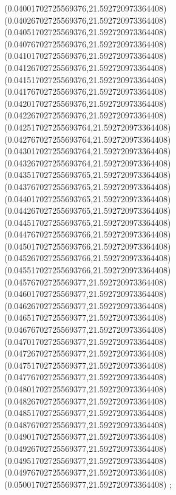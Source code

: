 {(0.04001702725569376,21.592720973364408)
(0.04026702725569376,21.592720973364408)
(0.04051702725569376,21.592720973364408)
(0.04076702725569376,21.592720973364408)
(0.04101702725569376,21.592720973364408)
(0.04126702725569376,21.592720973364408)
(0.04151702725569376,21.592720973364408)
(0.04176702725569376,21.592720973364408)
(0.04201702725569376,21.592720973364408)
(0.04226702725569376,21.592720973364408)
(0.042517027255693764,21.592720973364408)
(0.042767027255693764,21.592720973364408)
(0.043017027255693764,21.592720973364408)
(0.043267027255693764,21.592720973364408)
(0.043517027255693765,21.592720973364408)
(0.043767027255693765,21.592720973364408)
(0.044017027255693765,21.592720973364408)
(0.044267027255693765,21.592720973364408)
(0.044517027255693765,21.592720973364408)
(0.044767027255693766,21.592720973364408)
(0.045017027255693766,21.592720973364408)
(0.045267027255693766,21.592720973364408)
(0.045517027255693766,21.592720973364408)
(0.04576702725569377,21.592720973364408)
(0.04601702725569377,21.592720973364408)
(0.04626702725569377,21.592720973364408)
(0.04651702725569377,21.592720973364408)
(0.04676702725569377,21.592720973364408)
(0.04701702725569377,21.592720973364408)
(0.04726702725569377,21.592720973364408)
(0.04751702725569377,21.592720973364408)
(0.04776702725569377,21.592720973364408)
(0.04801702725569377,21.592720973364408)
(0.04826702725569377,21.592720973364408)
(0.04851702725569377,21.592720973364408)
(0.04876702725569377,21.592720973364408)
(0.04901702725569377,21.592720973364408)
(0.04926702725569377,21.592720973364408)
(0.04951702725569377,21.592720973364408)
(0.04976702725569377,21.592720973364408)
(0.05001702725569377,21.592720973364408)
};
